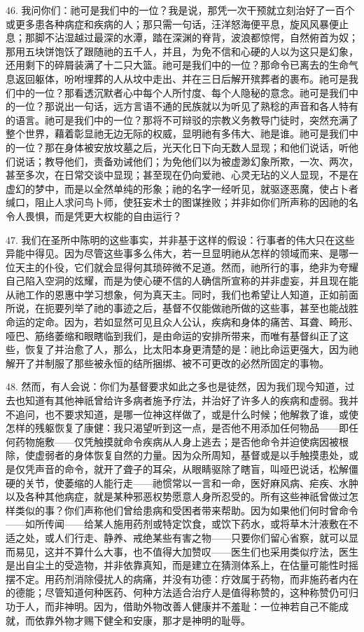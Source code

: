 46. 我问你们：祂可是我们中的一位？我是说，那凭一次干预就立刻治好了一百个或更多患各种病症和疾病的人；那只需一句话，汪洋怒海便平息，旋风风暴便止息；那脚不沾湿越过最深的水潭，踏在深渊的脊背，波浪都惊愕，自然俯首为奴；那用五块饼饱饫了跟随祂的五千人，并且，为免不信和心硬的人以为这只是幻象，还用剩下的碎屑装满了十二只大篮。祂可是我们中的一位？那命令已离去的生命气息返回躯体，吩咐埋葬的人从坟中走出、并在三日后解开殡葬者的裹布。祂可是我们中的一位？那看透沉默者心中每个人所忖度、每个人隐秘的意念。祂可是我们中的一位？那说出一句话，远方言语不通的民族就以为听见了熟稔的声音和各人特有的语言。祂可是我们中的一位？那将不可辩驳的宗教义务教导门徒时，突然充满了整个世界，藉着彰显祂无边无际的权威，显明祂有多伟大、祂是谁。祂可是我们中的一位？那在身体被安放坟墓之后，光天化日下向无数人显现；和他们说话，听他们说话；教导他们，责备劝诫他们；为免他们以为被虚渺幻象所欺，一次、两次，甚至多次，在日常交谈中显现；甚至现在仍向爱祂、心灵无玷的义人显现，不是在虚幻的梦中，而是以全然单纯的形象；祂的名字一经听见，就驱逐恶魔，使占卜者缄口，阻止人求问鸟卜师，使狂妄术士的图谋挫败；并非如你们所声称的因祂的名令人畏惧，而是凭更大权能的自由运行？\par

47. 我们在圣所中陈明的这些事实，并非基于这样的假设：行事者的伟大只在这些异能中得见。因为尽管这些事多么伟大，若一旦显明祂从怎样的领域而来、是哪一位天主的仆役，它们就会显得何其琐碎微不足道。然而，祂所行的事，绝非为夸耀自己陷入空洞的炫耀，而是为使心硬不信的人确信所宣称的并非虚妄，并且现在能从祂工作的恩惠中学习想象，何为真天主。同时，我们也希望让人知道，正如前面所说，在扼要列举了祂的事迹之后，基督不仅能做祂所做的这些事，甚至也能战胜命运的定命。因为，若如显然可见且众人公认，疾病和身体的痛苦、耳聋、畸形、哑巴、筋络萎缩和眼瞎临到我们，是由命运的安排所带来，而唯有基督纠正了这些，恢复了并治愈了人，那么，比太阳本身更清楚的是：祂比命运更强大，因为祂解开了并制服了那些被永恒的结所捆绑、被不可更改的必然所固定的事物。\par

48. 然而，有人会说：你们为基督要求如此之多也是徒然，因为我们现今知道，过去也知道有其他神祇曾给许多病者施予疗法，并治好了许多人的疾病和虚弱。我并不追问，也不要求知道，是哪一位神这样做了，或是什么时候；他解救了谁，或使怎样的残躯恢复了康健：我只渴望听到这一点，是否他不用添加任何物品——即任何药物施敷——仅凭触摸就命令疾病从人身上逃去；是否他命令并迫使病因被根除，使虚弱者的身体恢复自然的力量。因为众所周知，基督或是以手触摸患处，或是仅凭声音的命令，就开了聋子的耳朵，从眼睛驱除了瞎盲，叫哑巴说话，松解僵硬的关节，使萎缩的人能行走——祂惯常以一言和一命，医好麻风病、疟疾、水肿以及各种其他病症，就是某种邪恶权势愿意人身所忍受的。所有这些神祇曾做过怎样类似的事？你们声称他们曾给患病和受困者带来帮助。因为如果他们何时曾命令——如所传闻——给某人施用药剂或特定饮食，或饮下药水，或将草木汁液敷在不适之处，或人们行走、静养、戒绝某些有害之物——只要你们留心省察，就可以显而易见，这并不算什么大事，也不值得大加赞叹——医生们也采用类似疗法，医生是出自尘土的受造物，并非依靠真知，而是建立在猜测体系上，在估量可能性时摇摆不定。用药剂消除侵扰人的病痛，并没有功德：疗效属于药物，而非施药者内在的德能；尽管知道何种医药、何种方法适合治疗人是值得称赞的，这种称赞仍可归功于人，而非神明。因为，借助外物改善人健康并不羞耻：一位神若自己不能成就，而依靠外物才赐下健全和安康，那才是神明的耻辱。\par


